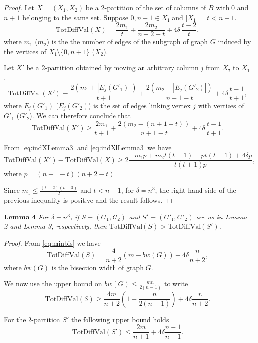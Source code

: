 \emph{Proof.} Let \(X=(X_1,X_2)\) be a 2-partition of the set of columns of \(\bar{B}\) with \(0\) and \(n+1\) belonging to the same set. Suppose \(0, n+1\in X_1\) and \(|X_1|=t < n-1\).
\begin{equation}
\mathrm{TotDiffVal}(X)=  \frac{2 m_1}{t} +  \frac{2 m_2}{n+2-t} + 4 \delta\,  \frac{t-2}{t},
\label{eq:indXLemma3}
\end{equation}
where \(m_1\) (\(m_2\)) is the the number of edges of the subgraph of graph \(G\) induced by the vertices of \(X_1\setminus \{0,n+1\}\) (\(X_2\)).

Let \(X'\) be a 2-partition obtained by moving an arbitrary column \(j\) from \(X_2\) to \(X_1\). \[\mathrm{TotDiffVal}(X')=  \frac{2 (m_1+ |E_j(G'_1)|)}{t+1} +  \frac{2 (m_2- |E_j(G'_2)|)}{n+1-t} + 4 \delta\,  \frac{t-1}{t+1},\] where \(E_j(G'_1)\) (\(E_j(G'_2)\)) is the set of edges linking vertex \(j\) with vertices of \(G'_1\) (\(G'_2\)).
We can therefore conclude that
\begin{equation}
\mathrm{TotDiffVal}(X')\geq  \frac{2 m_1}{t+1} +  \frac{2 (m_2-(n+1-t))}{n+1-t} + 4 \delta\,  \frac{t-1}{t+1}.
\label{eq:indXlLemma3}
\end{equation}

From \eqref{eq:indXLemma3} and \eqref{eq:indXlLemma3} we have \[ \mathrm{TotDiffVal}(X') - \mathrm{TotDiffVal}(X) \geq 2 \frac{-m_1 p  + m_2 t (t+1) - p t (t+1) + 4 \delta p} {t(t+1) p},\] where \(p =(n+1-t)(n+2-t)\).

Since \(m_1\leq \frac{(t-2)(t-3)}{2}\) and \(t<n-1\), for \(\delta=n^3\), the right hand side of the previous inequality is positive and the result follows. \(\Box\)

\textbf{Lemma 4} \emph{For \(\delta = n^3\), if \(S=(G_1,G_2)\) and \(S'=(G'_1,G'_2)\) are as in Lemma 2 and Lemma 3, respectively, then \(\mathrm{TotDiffVal}(S) > \mathrm{TotDiffVal} (S')\).}

\emph{Proof.} From \eqref{eq:minbis} we have \[ \mathrm{TotDiffVal}(S)= \frac{4}{n+2} (m-bw(G)) +  4 \delta \frac{n}{n+2},\] where \(bw(G)\) is the bisection width of graph \(G\).

We now use the upper bound on \(bw(G)\leq  \frac{m n}{2 (n-1)}\) \cite[p. 3]{Ts2017} to write \[\mathrm{TotDiffVal}(S)\geq  \frac{4 m}{n+2} \left(1 -\frac{n}{2(n-1)}\right) +  4 \delta \frac{n}{n+2}.\]

For the 2-partition \(S'\) the following upper bound holds
\[ \mathrm{TotDiffVal}(S')\leq   \frac{2 m}{n+1} +  4 \delta \frac{n-1}{n+1}.\]

